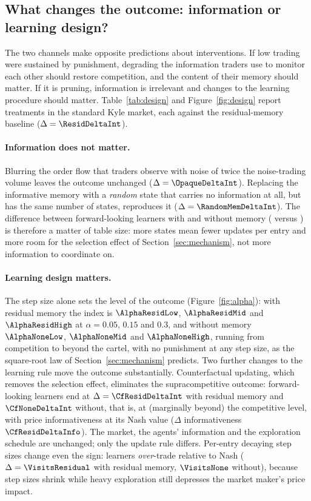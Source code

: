 \subsection{What changes the outcome: information or learning design?}
\label{sec:design}

The two channels make opposite predictions about interventions. If low trading
were sustained by punishment, degrading the information traders use to
monitor each other should restore competition, and the content of their memory
should matter. If it is pruning, information is irrelevant and changes to the
learning procedure should matter. Table~\ref{tab:design} and
Figure~\ref{fig:design} report treatments in the standard Kyle market, each
against the residual-memory baseline ($\Delta=\ResidDeltaInt$).

\paragraph{Information does not matter.} Blurring the order flow that traders
observe with noise of twice the noise-trading volume leaves the outcome
unchanged ($\Delta=\OpaqueDeltaInt$). Replacing the informative memory with a
\emph{random} state that carries no information at all, but has the same
number of states, reproduces it ($\Delta=\RandomMemDeltaInt$). The difference
between forward-looking learners with and without memory
(\ResidDeltaInt{} versus \NoneDeltaInt{}) is therefore a matter of table size:
more states mean fewer updates per entry and more room for the selection effect
of Section~\ref{sec:mechanism}, not more information to coordinate on.

\paragraph{Learning design matters.} The step size alone sets the level of the
outcome (Figure~\ref{fig:alpha}): with residual memory the index is
$\AlphaResidLow$, $\AlphaResidMid$ and $\AlphaResidHigh$ at $\alpha=0.05$,
$0.15$ and $0.3$, and without memory $\AlphaNoneLow$, $\AlphaNoneMid$ and
$\AlphaNoneHigh$, running from competition to beyond the cartel, with no
punishment at any step size, as the square-root law of
Section~\ref{sec:mechanism} predicts. Two further changes to the learning
rule move the outcome substantially. Counterfactual updating, which removes the selection
effect, eliminates the supracompetitive outcome: forward-looking learners end
at $\Delta=\CfResidDeltaInt$ with residual memory and $\CfNoneDeltaInt$ without,
that is, at (marginally beyond) the competitive level, with price
informativeness at its Nash value ($\Delta$ informativeness
$\CfResidDeltaInfo$). The market, the agents' information and the exploration
schedule are unchanged; only the update rule differs. Per-entry decaying step sizes
change even the sign: learners \emph{over}-trade relative to Nash
($\Delta=\VisitsResidual$ with residual memory, $\VisitsNone$ without),
because step sizes shrink while heavy exploration still depresses the market
maker's price impact.

